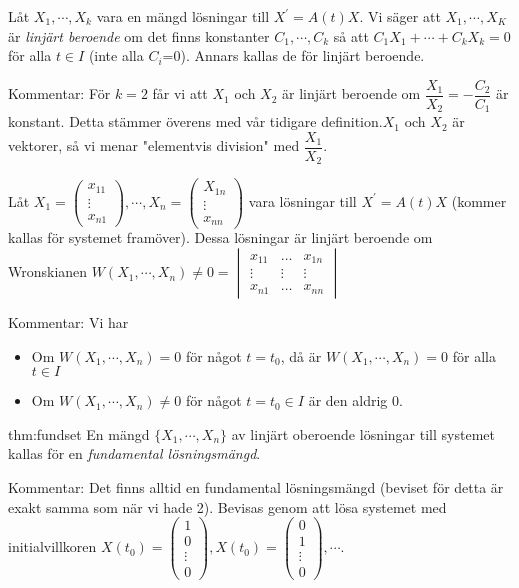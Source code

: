 \begin{theo}
  Låt $X_1,\cdots, X_k$ vara en mängd lösningar till $X^{\prime}=A(t)X$. Vi säger att $X_1, \cdots, X_K$ är \textit{linjärt beroende} om det finns konstanter $C_1,\cdots, C_k$ så att $C_1X_1+\cdots+C_kX_k=0$ för alla $t\in I$ (inte alla $C_i$=0). Annars kallas de för linjärt beroende.
\end{theo}
\par\bigskip
\noindent Kommentar: För $k=2$ får vi att $X_1$ och $X_2$ är linjärt beroende om $\dfrac{X_1}{X_2}=-\dfrac{C_2}{C_1}$ är konstant. Detta stämmer överens med vår tidigare definition.$X_1$ och $X_2$ är vektorer, så vi menar "elementvis division" med $\dfrac{X_1}{X_2}$.
\par\bigskip
\noindent Låt $X_1 = \begin{pmatrix}x_{11}\\\vdots\\x_{n1}\end{pmatrix},\cdots, X_n = \begin{pmatrix}X_{1n}\\\vdots\\x_{nn}\end{pmatrix}$ vara lösningar till $X^{\prime}=A(t)X$ (kommer kallas för systemet framöver). Dessa lösningar är linjärt beroende om Wronskianen $W(X_1,\cdots, X_n) \neq 0 = \begin{vmatrix}x_{11}&\hdots&x_{1n}\\\vdots&\vdots&\vdots\\x_{n1}&\hdots&x_{nn}\end{vmatrix}$ 
\par\bigskip
\noindent Kommentar: Vi har
\begin{itemize}
  \item Om $W(X_1,\cdots, X_n) = 0$ för något $t=t_0$, då är $W(X_1,\cdots, X_n)=0$ för alla $t\in I$
  \item Om $W(X_1,\cdots, X_n)\neq0$ för något $t=t_0\in I$ är den aldrig 0.
\end{itemize}
\par\bigskip
\begin{theo}{thm:fundset}
  En mängd $\{X_1, \cdots, X_n\}$ av linjärt oberoende lösningar till systemet kallas för en \textit{fundamental lösningsmängd}.
\end{theo}
\par\bigskip
\noindent Kommentar: Det finns alltid en fundamental lösningsmängd (beviset för detta är exakt samma som när vi hade 2). Bevisas genom att lösa systemet med initialvillkoren $X(t_0)=\begin{pmatrix}1\\0\\\vdots\\0\end{pmatrix}, X(t_0) = \begin{pmatrix}0\\1\\\vdots\\0\end{pmatrix},\cdots$.\par
